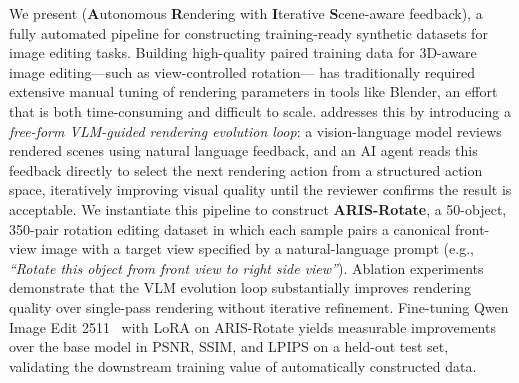 We present \aris{} (\textbf{A}utonomous \textbf{R}endering with \textbf{I}terative \textbf{S}cene-aware feedback),
a fully automated pipeline for constructing training-ready synthetic datasets for image editing tasks.
Building high-quality paired training data for 3D-aware image editing---such as view-controlled rotation---
has traditionally required extensive manual tuning of rendering parameters in tools like Blender,
an effort that is both time-consuming and difficult to scale.
\aris{} addresses this by introducing a \emph{free-form VLM-guided rendering evolution loop}:
a vision-language model reviews rendered scenes using natural language feedback,
and an AI agent reads this feedback directly to select the next rendering action
from a structured action space, iteratively improving visual quality
until the reviewer confirms the result is acceptable.
We instantiate this pipeline to construct \textbf{ARIS-Rotate},
a 50-object, 350-pair rotation editing dataset in which each sample pairs
a canonical front-view image with a target view specified by a natural-language prompt
(e.g., \textit{``Rotate this object from front view to right side view''}).
Ablation experiments demonstrate that the VLM evolution loop substantially improves
rendering quality over single-pass rendering without iterative refinement.
Fine-tuning Qwen Image Edit 2511~\cite{PLACEHOLDER_qwen_image_edit_verify} with LoRA on ARIS-Rotate
yields measurable improvements over the base model in PSNR, SSIM, and LPIPS on a held-out test set,
validating the downstream training value of automatically constructed data.
